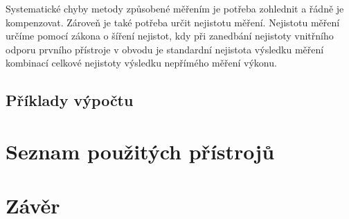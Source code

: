 \documentclass[a4paper, czech]{article}
\begin{document}
Systematické chyby metody způsobené měřením je potřeba zohlednit a řádně je kompenzovat.
Zároveň je také potřeba určit nejistotu měření.
Nejistotu měření určíme pomocí zákona o šíření nejistot, kdy při zanedbání nejistoty vnitřního odporu prvního přístroje v obvodu je standardní nejistota výsledku měření kombinací celkové nejistoty výsledku nepřímého měření výkonu. 

\subsection{Příklady výpočtu}

\section{Seznam použitých přístrojů}

\section{Závěr}
\end{document}
